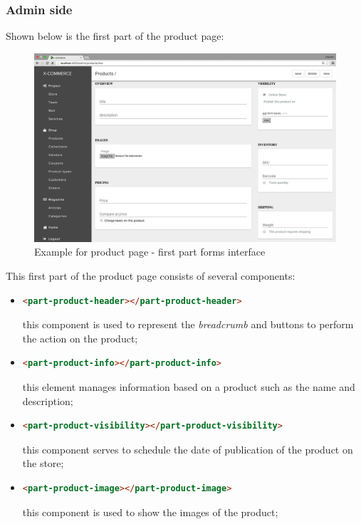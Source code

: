 \subsubsection{Admin side}
Shown below is the first part of the product page:
\begin{figure}[htb]
\centering
\includegraphics[width=1.0\linewidth]{images/chapter4/product-page-ex1.png}\hfill
\caption[Product page first part form]{Example for product page - first part forms interface}
\label{fig:design_page}
\end{figure}
This first part of the product page consists of several components:
\begin{itemize}
\item
\begin{lstlisting}[language=html]
<part-product-header></part-product-header>
\end{lstlisting}
this component is used to represent the \emph{breadcrumb} and buttons to perform the action on the product;
\item
\begin{lstlisting}[language=html]
<part-product-info></part-product-info>
\end{lstlisting}
this element manages information based on a product such as the name and description;
\item
\begin{lstlisting}[language=html]
<part-product-visibility></part-product-visibility>
\end{lstlisting}
this component serves to schedule the date of publication of the product on the store;
\item
\begin{lstlisting}[language=html]
<part-product-image></part-product-image>
\end{lstlisting}
this component is used to show the images of the product;
\end{itemize}
